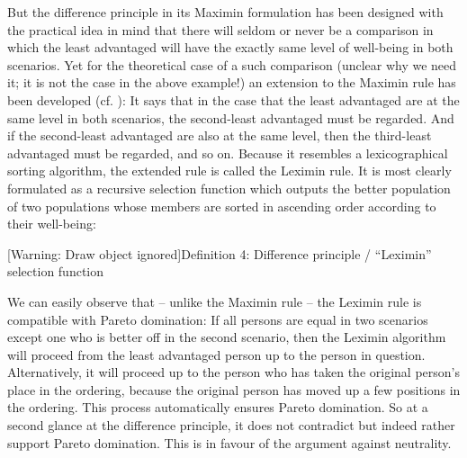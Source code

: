 But the difference principle in its Maximin formulation has been designed with the practical idea in mind that there will seldom or never be a comparison in which the least advantaged will have the exactly same level of well-being in both scenarios. Yet for the theoretical case of a such comparison (unclear why we need it; it is not the case in the above example!) an extension to the Maximin rule has been developed (cf. ): It says that in the case that the least advantaged are at the same level in both scenarios, the second-least advantaged must be regarded. And if the second-least advantaged are also at the same level, then the third-least advantaged must be regarded, and so on. Because it resembles a lexicographical sorting algorithm, the extended rule is called the Leximin rule. It is most clearly formulated as a recursive selection function which outputs the better population of two populations whose members are sorted in ascending order according to their well-being:  

[Warning: Draw object ignored]Definition 4: Difference principle / “Leximin” selection function  
\begin{comment}
\begin{flushleft} \tablefirsthead{} \tablehead{} \tabletail{} \tablelasttail{} \begin{supertabular}{m{1.546cm}m{1.8369999cm}m{1.0439999cm}m{0.274cm}m{3.9009998cm}m{5.4370003cm}} ~  & ~  & ~  & ~  & u(s1) {\textgreater} u(t1) & \{S\}\\ lexiMin( & S=s1...sn, 

T=t1...tn & ) = & ~  & u(t1) {\textgreater} u(s1) & \{T\}\\  &  &  & ~  & S = T = ${\emptyset}$ & \{S, T\}\\ \multicolumn{2}{m{3.583cm}}{with: 

u(s1) ${\leq}$ … ${\leq}$ u(sn) u(t1) \ ${\leq}$ … ${\leq}$ u(tn)} & ~  & ~  & u(t1) = u(s1) & lexiMin(s2...sn, t2...tn)\\ \end{supertabular} \end{flushleft} 
\end{comment}
\bigskip 

We can easily observe that – unlike the Maximin rule – the Leximin rule is compatible with Pareto domination: If all persons are equal in two scenarios except one who is better off in the second scenario, then the Leximin algorithm will proceed from the least advantaged person up to the person in question. Alternatively, it will proceed up to the person who has taken the original person’s place in the ordering, because the original person has moved up a few positions in the ordering. This process automatically ensures Pareto domination. So at a second glance at the difference principle, it does not contradict but indeed rather support Pareto domination. This is in favour of the argument against neutrality.  

